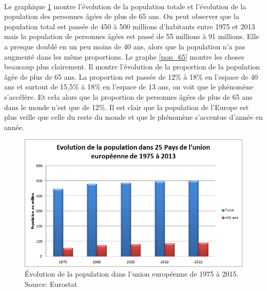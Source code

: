 \paragraph{}Le graphique \ref{eu_demo} montre l’évolution de la population totale et l’évolution de la population des personnes âgées de plus de 65 ans. On peut observer que la population total est passée de 450 à 500 millions d’habitants entre 1975 et 2013 mais la population de personnes âgées est passé de 55 millions à 91 millions. Elle a presque doublé en un peu moins de 40 ans, alors que la population n’a pas augmenté dans les même proportions. Le graphe \ref{pop_65} montre les choses beaucoup plus clairement. Il montre l’évolution de la proportion de la population âgée de plus de 65 ans. La proportion est passée de 12\% à 18\% en l’espace de 40 ans et surtout de 15,5\% à 18\% en l’espace de 13 ans, on voit que le phénomène s'accélère.  Et cela alors que la proportion de personnes âgées de plus de 65 ans dans le monde n’est que de 12\%\citep{ined}. Il est clair que la population de l’Europe est plus veille que celle du reste du monde et que le phénomène s’accentue d’année en année. 


\begin{figure}[h!]
    \begin{center}
        \includegraphics[scale=0.7]{document/pop_eu.png}
        \caption{Évolution de la population dans l'union européenne de 1975 à 2015. Source: Eurostat\citep{eurostat_pop}}
        \label{eu_demo}
    \end{center}
\end{figure}


